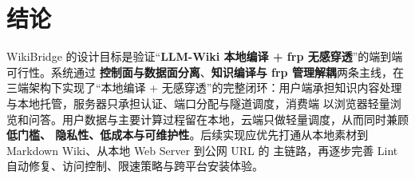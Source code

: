 \documentclass[UTF8,a4paper,12pt]{ctexart}
\newcommand{\keypoint}[1]{\textcolor{whu}{\textbf{#1}}}
\begin{document}
\section*{结论}
WikiBridge 的设计目标是验证“\keypoint{LLM-Wiki 本地编译 + frp 无感穿透}”的端到端可行性。系统通过
\keypoint{控制面与数据面分离}、\keypoint{知识编译与 frp 管理解耦}两条主线，在三端架构下实现了“本地编译 +
无感穿透”的完整闭环：用户端承担知识内容处理与本地托管，服务器只承担认证、端口分配与隧道调度，消费端
以浏览器轻量浏览和问答。用户数据与主要计算过程留在本地，云端只做轻量调度，从而同时兼顾\keypoint{低门槛、
隐私性、低成本与可维护性}。后续实现应优先打通从本地素材到 Markdown Wiki、从本地 Web Server 到公网 URL 的
主链路，再逐步完善 Lint 自动修复、访问控制、限速策略与跨平台安装体验。
\end{document}
